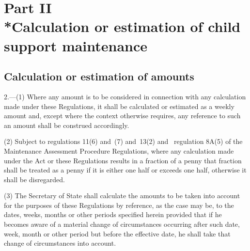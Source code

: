 \documentclass[12pt,a4paper]{article}
\begin{document}
\section[Part II --- Calculation or estimation of child support maintenance]{\sloppy Part II\\*Calculation or estimation of child support maintenance}

\renewcommand\parthead{--- Part II}

\subsection[2. Calculation or estimation of amounts]{Calculation or estimation of amounts}

2.—(1) Where any amount 
is to be considered in connection with any calculation made under these Regulations,  %
it shall be calculated or estimated as a weekly amount and, except where the context otherwise requires, any reference to such an amount shall be construed accordingly.

(2) Subject to 
regulations 11(6) and~(7) and~13(2) and~
  regulation 8A(5)  %
of the Maintenance Assessment Procedure Regulations,  %
where any calculation made under 
the Act or  %
these Regulations results in a fraction of a penny that fraction shall be treated as a penny if it is either one half or exceeds one half, otherwise it shall be disregarded.

(3) 
The Secretary of State  %
shall calculate the amounts to be taken into account for the purposes of these Regulations by reference, as the case may be, to the dates, weeks, months or other periods specified herein provided that if he becomes aware of a material change of circumstances occurring after such date, week, month or other period but before the effective date, he shall take that change of circumstances into account.

\end{document}
